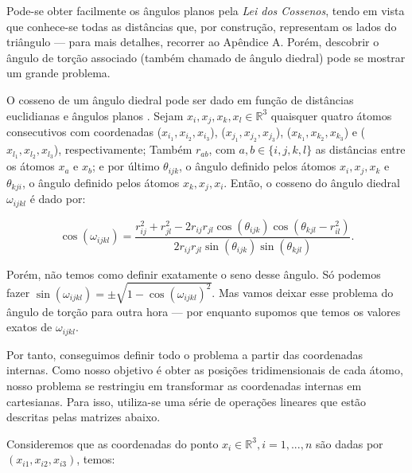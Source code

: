 \documentclass[a4paper,12pt]{article}
\begin{document}
	Pode-se obter facilmente os ângulos planos pela \textit{Lei dos Cossenos}, tendo em vista que conhece-se todas as distâncias que, por construção, representam os lados do triângulo --- para mais detalhes, recorrer ao Apêndice A. Porém, descobrir o ângulo de torção associado (também chamado de ângulo diedral) pode se mostrar um grande problema. 
	
	O cosseno de um ângulo diedral pode ser dado em função de distâncias euclidianas e ângulos planos \cite{carlileTese}. Sejam $x_i, x_j, x_k, x_l \in \mathbb{R}^3$ quaisquer quatro átomos consecutivos com coordenadas ($x_{i_1}, x_{i_2}, x_{i_3}$), ($x_{j_1}, x_{j_2}, x_{j_3}$), ($x_{k_1}, x_{k_2}, x_{k_3}$) e ($x_{l_1}, x_{l_2}, x_{l_3}$), respectivamente; Também $r_{ab}$, com $a,b \in \{i,j,k,l\}$ as distâncias entre os átomos $x_a$ e $x_b$; e por último $\theta_{ijk}$, o ângulo definido pelos átomos $x_i, x_j, x_k$ e $\theta_{kji}$, o ângulo definido pelos átomos $x_k, x_j, x_i$. Então, o cosseno do ângulo diedral $\omega_{ijkl}$ é dado por:
	
	\begin{equation}
	\cos(\omega_{ijkl}) = \frac{r^2_{ij} + r^2_{jl} - 2r_{ij}r_{jl}\cos(\theta_{ijk})\cos(\theta_{kjl}-r^2_{il})}{2r_{ij}r_{jl}\sin(\theta_{ijk})\sin(\theta_{kjl})}. \label{eq:cosOmega}
	\end{equation}    
	
	Porém, não temos como definir exatamente o seno desse ângulo. Só podemos fazer $\sin(\omega_{ijkl}) = \pm\sqrt{1 - \cos(\omega_{ijkl})^2} \label{eq:senOmega}$. Mas vamos deixar esse problema do ângulo de torção para outra hora --- por enquanto supomos que temos os valores exatos de $\omega_{ijkl}$.
	
	Por tanto, conseguimos definir todo o problema a partir das coordenadas internas. Como nosso objetivo é obter as posições tridimensionais de cada átomo, nosso problema se restringiu em transformar as coordenadas internas em cartesianas. Para isso, utiliza-se uma série de operações lineares que estão descritas pelas matrizes abaixo.
	
	Consideremos que as coordenadas do ponto $x_{i} \in\mathbb{R}^3,i= 1, ...,n $ são dadas por $(x_{i1},x_{i2},x_{i3})$, temos:
	
\end{document}
